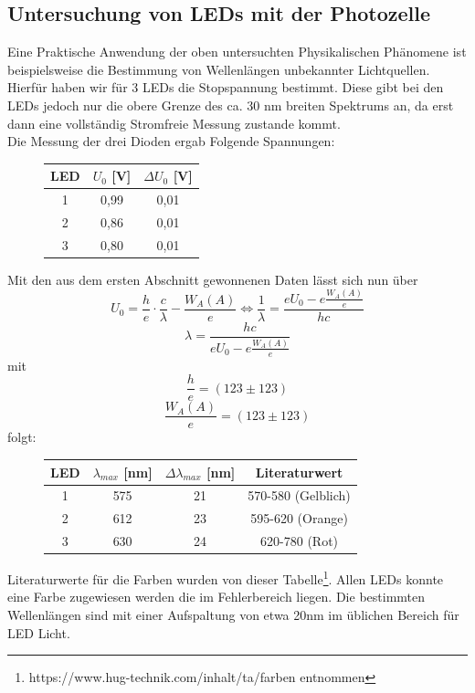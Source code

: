 \documentclass{scrartcl}
\begin{document}
	\subsection{Untersuchung von LEDs mit der Photozelle}
		Eine Praktische Anwendung der oben untersuchten Physikalischen Phänomene ist beispielsweise
		die Bestimmung von Wellenlängen unbekannter Lichtquellen. Hierfür haben wir für 3 LEDs die 
		Stopspannung bestimmt. Diese gibt bei den LEDs jedoch nur die obere Grenze des ca. 30 nm breiten Spektrums an,
		da erst dann eine vollständig Stromfreie Messung zustande kommt.\\
		Die Messung der drei Dioden ergab Folgende Spannungen:
		\begin{figure}[H]
			\centering
			\begin{tabular}{|c|c|c|}
				\hline
				LED & $U_0$ [V] & $\Delta U_0$ [V] \\
				\hline
				1 & 0,99 & 0,01\\
				2 & 0,86 & 0,01\\
				3 & 0,80 & 0,01\\
				\hline
			\end{tabular}
		\end{figure}
		Mit den aus dem ersten Abschnitt gewonnenen Daten lässt sich nun über
		\begin{equation}
			U_0 = \frac{h}{e}\cdot\frac{c}{\lambda} - \frac{W_A(A)}{e} 
			\Leftrightarrow 
			\frac{1}{\lambda} = \frac{eU_0 - e\frac{W_A(A)}{e}}{hc}
		\end{equation}
		\begin{equation}
			\lambda = \frac{hc}{eU_0 - e\frac{W_A(A)}{e}}
		\end{equation}
		mit 
		$$ \frac{h}{e} = (123 \pm 123)$$
		$$ \frac{W_A(A)}{e} = (123 \pm 123)$$
		folgt:
		\begin{figure}[H]
			\centering
			\begin{tabular}{|c|c|c|c|}
				\hline
				LED & $\lambda_{max}$ [nm] & $\Delta\lambda_{max}$ [nm] & Literaturwert \\
				\hline
				1 & 575 & 21 & 570-580 (Gelblich)\\
				2 & 612 & 23 & 595-620 (Orange)\\
				3 & 630 & 24 & 620-780 (Rot)\\
				\hline
			\end{tabular}
		\end{figure}
		Literaturwerte für die Farben wurden von dieser Tabelle\footnote{https://www.hug-technik.com/inhalt/ta/farben entnommen}.
		Allen LEDs konnte eine Farbe zugewiesen werden die im Fehlerbereich liegen. Die bestimmten Wellenlängen sind mit einer 
		Aufspaltung von etwa 20nm im üblichen Bereich für LED Licht. 
\end{document}
